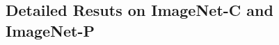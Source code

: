 \documentclass{article}
\theoremstyle{plain}
\theoremstyle{definition}
\theoremstyle{remark}
\begin{document}



\subsection{Detailed Resuts on ImageNet-C and ImageNet-P}
\end{document}
